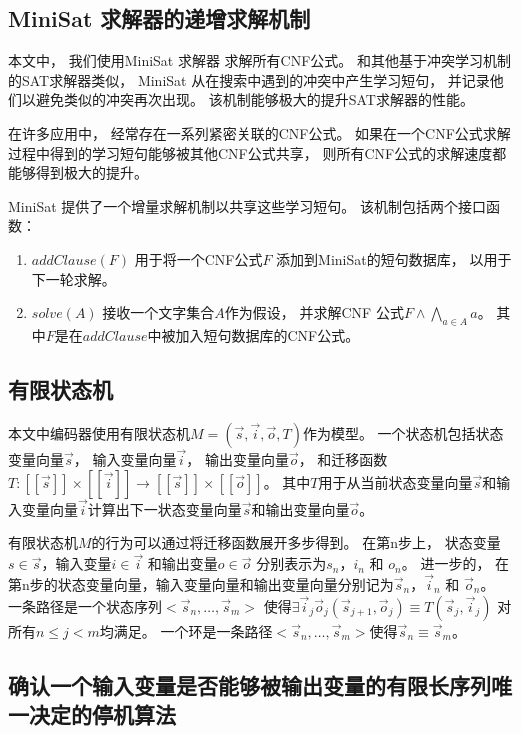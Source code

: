 \subsection{MiniSat 求解器的递增求解机制}\label{subsec_incsat}

本文中，
我们使用MiniSat 求解器 求解所有CNF公式。
和其他基于冲突学习机制的SAT求解器类似，
MiniSat 从在搜索中遇到的冲突中产生学习短句，
并记录他们以避免类似的冲突再次出现。
该机制能够极大的提升SAT求解器的性能。

在许多应用中，
经常存在一系列紧密关联的CNF公式。
如果在一个CNF公式求解过程中得到的学习短句能够被其他CNF公式共享，
则所有CNF公式的求解速度都能够得到极大的提升。

MiniSat 提供了一个增量求解机制以共享这些学习短句。
该机制包括两个接口函数：
\begin{enumerate}
\item
$addClause(F)$ 用于将一个CNF公式$F$ 添加到MiniSat的短句数据库，
以用于下一轮求解。
\item
$solve(A)$ 接收一个文字集合$A$作为假设，
并求解CNF 公式$F\wedge \bigwedge_{a\in A} a$。
其中$F$是在$addClause$中被加入短句数据库的CNF公式。
\end{enumerate}


\subsection{有限状态机}

本文中编码器使用有限状态机$M=(\vec{s},\vec{i},\vec{o},T)$作为模型。
一个状态机包括状态变量向量$\vec{s}$，
输入变量向量$\vec{i}$，
输出变量向量$\vec{o}$，
和迁移函数$T: [\![\vec{s}]\!]\times [\![\vec{i}]\!]\to [\![\vec{s}]\!]\times [\![\vec{o}]\!]$。
其中$T$用于从当前状态变量向量$\vec{s}$和输入变量向量$\vec{i}$计算出下一状态变量向量$\vec{s}$和输出变量向量$\vec{o}$。

有限状态机$M$的行为可以通过将迁移函数展开多步得到。
在第n步上，
状态变量$s\in\vec{s}$，输入变量$i\in\vec{i}$ 和输出变量$o\in\vec{o}$
分别表示为$s_n$，$i_n$ 和 $o_n$。
进一步的，
在第n步的状态变量向量，输入变量向量和输出变量向量分别记为$\vec{s}_n$，$\vec{i}_n$ 和 $\vec{o}_n$。
一条路径是一个状态序列$<\vec{s}_n,\dots,\vec{s}_m>$ 使得$\exists \vec{i}_j\vec{o}_j (\vec{s}_{j+1},\vec{o}_j)\equiv T(\vec{s}_j,\vec{i}_j)$ 对所有$n\le j< m$均满足。
一个环是一条路径$<\vec{s}_n,\dots,\vec{s}_m>$使得$\vec{s}_n\equiv \vec{s}_m$。

\subsection{确认一个输入变量是否能够被输出变量的有限长序列唯一决定的停机算法}\label{subsec_chkextdec}

